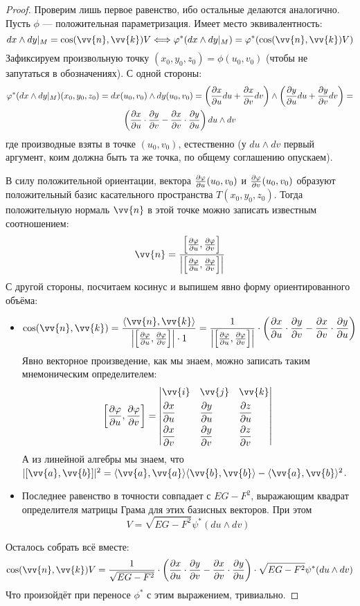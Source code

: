 \begin{proof}
	Проверим лишь первое равенство, ибо остальные делаются аналогично. Пусть $\phi$ --- положительная параметризация. Имеет место эквивалентность:
	\[
		dx \wedge dy|_M = \cos(\vv{n}, \vv{k})V \Longleftrightarrow \phi^*(dx \wedge dy|_M) = \phi^*(\cos(\vv{n}, \vv{k})V)
	\]
	Зафиксируем произвольную точку $(x_0, y_0, z_0) = \phi(u_0, v_0)$ (чтобы не запутаться в обозначениях). С одной стороны:
	\begin{multline*}
		\varphi^*(dx \wedge dy|_M)(x_0, y_0, z_0) = dx(u_0, v_0) \wedge dy(u_0, v_0) = \left(\frac{\partial x}{\partial u}du + \frac{\partial x}{\partial v}dv\right) \wedge \left(\frac{\partial y}{\partial u}du + \frac{\partial y}{\partial v}dv\right) =
		\\
		\left(\frac{\partial x}{\partial u} \cdot \frac{\partial y}{\partial v} - \frac{\partial x}{\partial v} \cdot \frac{\partial y}{\partial u}\right)du \wedge dv
	\end{multline*}
	где производные взяты в точке $(u_0, v_0)$, естественно (у $du \wedge dv$ первый аргумент, коим должна быть та же точка, по общему соглашению опускаем).
	
	В силу положительной ориентации, вектора $\frac{\partial \varphi}{\partial u}(u_0, v_0)$ и $\frac{\partial \varphi}{\partial v}(u_0, v_0)$ образуют положительный базис касательного пространства $T(x_0, y_0, z_0)$. Тогда положительную нормаль $\vv{n}$ в этой точке можно записать известным соотношением:
	\[
		\vv{n} = \frac{\sbr{\pd{\phi}{u}, \pd{\phi}{v}}}{\md{\sbr{\pd{\phi}{u}, \pd{\phi}{v}}}}
	\]
	С другой стороны, посчитаем косинус и выпишем явно форму ориентированного объёма:
	\begin{itemize}
		\item \[
			\cos(\vv{n}, \vv{k}) = \frac{\ntbr{\vv{n}, \vv{k}}}{\md{\sbr{\pd{\phi}{u}, \pd{\phi}{v}}} \cdot 1} = \frac{1}{\md{\sbr{\pd{\phi}{u}, \pd{\phi}{v}}}} \cdot \ps{\pd{x}{u} \cdot \pd{y}{v} - \pd{x}{v} \cdot \pd{y}{u}}
		\]
		Явно векторное произведение, как мы знаем, можно записать таким мнемоническим определителем:
		\[
			\sbr{\pd{\phi}{u}, \pd{\phi}{v}} = \Det{
				&\vv{i}& &\vv{j}& &\vv{k}
				\\
				&\pd{x}{u}& &\pd{y}{u}& &\pd{z}{u}
				\\
				&\pd{x}{v}& &\pd{y}{v}& &\pd{z}{v}
			}
		\]
		А из линейной алгебры мы знаем, что $|[\vv{a}, \vv{b}]|^2 = \ntbr{\vv{a}, \vv{a}}\ntbr{\vv{b}, \vv{b}} - \ntbr{\vv{a}, \vv{b}}^2$.
		
		\item Последнее равенство в точности совпадает с $EG - F^2$, выражающим квадрат определителя матрицы Грама для этих базисных векторов. При этом
		\[
			V = \sqrt{EG - F^2} \psi^*(du \wedge dv)
		\]
	\end{itemize}
	Осталось собрать всё вместе:
	\[
		\cos(\vv{n}, \vv{k})V = \frac{1}{\sqrt{EG - F^2}} \cdot \ps{\pd{x}{u} \cdot \pd{y}{v} - \pd{x}{v} \cdot \pd{y}{u}} \cdot \sqrt{EG - F^2} \psi^*(du \wedge dv)
	\]
	Что произойдёт при переносе $\phi^*$ с этим выражением, тривиально.
\end{proof}

